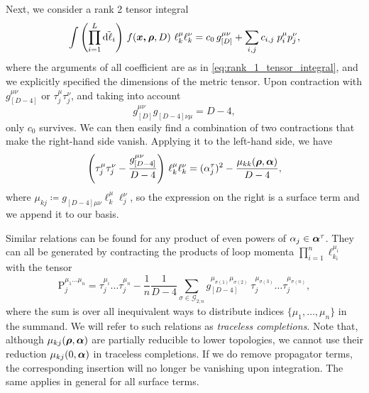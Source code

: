 Next, we consider a rank 2 tensor integral
\begin{equation}
  \int \qty(\prod_{i=1}^{L} \tilde{\dd{\ell_i}}){}~ f(\vb*{\vb*{x},\vb*{\rho}},D) ~ \ell_k^{\mu}\ell_k^{\nu} = c_0\,g^{\mu\nu}_{[D]} + \sum_{i,j}^{}c_{i,j}\;p^\mu_i p^\nu_j,
\end{equation}
where the arguments of all coefficient are as in \cref{eq:rank_1_tensor_integral}, and we explicitly specified the dimensions of the metric tensor.
Upon contraction with $g^{\mu\nu}_{[D-4]}$ or $\tau_j^\mu\tau_j^\nu$, and taking into account
\[
  g^{\mu\nu}_{[D]}g^{\phantom{\mu\nu}}_{[D-4]\nu\mu} = D-4,
\]
only $c_0$ survives.
We can then easily find a combination of two contractions that make the right-hand side vanish. Applying it to the left-hand side, we have
\begin{equation}
  \qty(\tau_j^\mu\tau_j^\nu - \frac{g^{\mu\nu}_{[D-4]}}{D-4}) ~ \ell_k^{\mu}\ell_k^{\nu} = (\alpha_j^\tau)^2 - \frac{\mu_{kk}(\vb*{\rho},\vb*{\alpha})}{D-4},
\end{equation}
where $\mu_{kj} \coloneqq g^{\phantom{\mu\nu}}_{[D-4]\mu\nu} \ell_k^\mu \ell_j^\nu$, so the expression on the right is a surface term and
we append it to our basis.

Similar relations can be found for any product of even powers of $\alpha_j \in \vb*{\alpha}^\tau$.
They can all be generated by contracting the products of loop momenta $\prod_{i=1}^{n}\ell^{\mu_i}_{k_i}$ with the tensor
\begin{equation}
  \mathrm{P}^{\mu_1\ldots{}\mu_n}_j =  \tau^{\mu_i}_j\ldots{}\tau^{\mu_n}_j - \frac{1}{n}\frac{1}{D-4} \sum_{\sigma \in \mathcal{G}_{2;n}}^{} g^{\mu_{\sigma(1)}\mu_{\sigma(2)}}_{[D-4]}~\tau^{\mu_{\sigma(3)}}_j\ldots{}\tau^{\mu_{\sigma(n)}}_j,
\end{equation}
where the sum is over all inequivalent ways to distribute indices $\{\mu_1,\ldots{},\mu_n\}$ in the summand.
We will refer to such relations as \emph{traceless completions}.
Note that, although $\mu_{kj}(\vb*{\rho},\vb*{\alpha})$ are partially reducible to lower topologies,
we cannot use their reduction $\mu_{kj}(0,\vb*{\alpha})$ in traceless completions. If we do remove propagator terms, the
corresponding insertion will no longer be vanishing upon integration.
The same applies in general for all surface terms.

